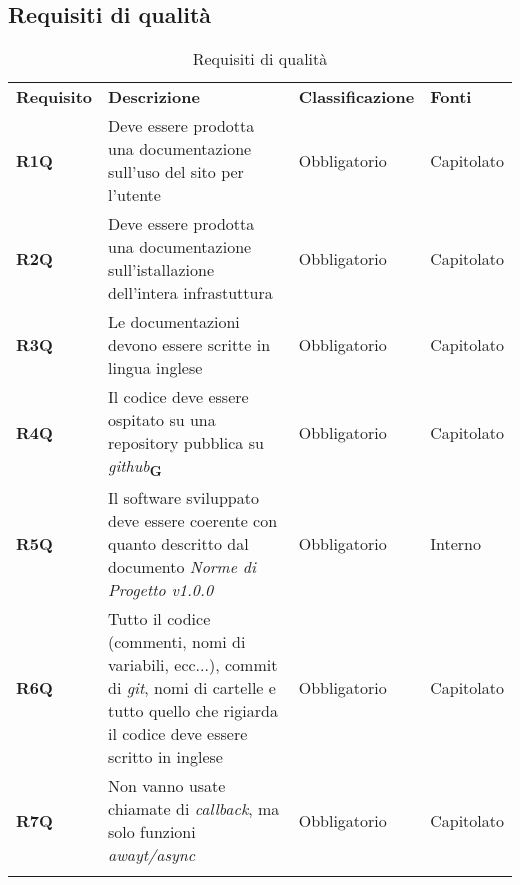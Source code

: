 \subsection{Requisiti di qualità}
\begin{center}
    \centering
    \renewcommand{\arraystretch}{1.8}
    \label{tab:RequisitiQualita}
    \begin{longtable}[!h]{p{50px} p{200px} p{100px} p{50px}}
        \rowcolor{logo!70} \textbf{Requisito} & \textbf{Descrizione}                                                                                                                                                 & \textbf{Classificazione} & \textbf{Fonti} \\
        \textbf{R1Q}                          & Deve essere prodotta una documentazione sull'uso del sito per l'utente                                                                                               & Obbligatorio             & Capitolato     \\
        \textbf{R2Q}                          & Deve essere prodotta una documentazione sull'istallazione dell'intera infrastuttura                                                                                  & Obbligatorio             & Capitolato     \\
        \textbf{R3Q}                          & Le documentazioni devono essere scritte in lingua inglese                                                                                                            & Obbligatorio             & Capitolato     \\
        \textbf{R4Q}                          & Il codice deve essere ospitato su una repository pubblica su \textit{github}\textsubscript{\textbf{G}}                                                               & Obbligatorio             & Capitolato     \\
        \textbf{R5Q}                          & Il software sviluppato deve essere coerente con quanto descritto dal documento \textit{Norme di Progetto v1.0.0}                                                     & Obbligatorio             & Interno        \\
        \textbf{R6Q}                          & Tutto il codice (commenti, nomi di variabili, ecc...), commit di \textit{git}, nomi di cartelle e tutto quello che rigiarda il codice deve essere scritto in inglese & Obbligatorio             & Capitolato     \\
        \textbf{R7Q}                          & Non vanno usate chiamate di \textit{callback}, ma solo funzioni \textit{awayt/async}                                                                                 & Obbligatorio             & Capitolato     \\
        \rowcolor{white}\caption{Requisiti di qualità}
    \end{longtable}
\end{center}

